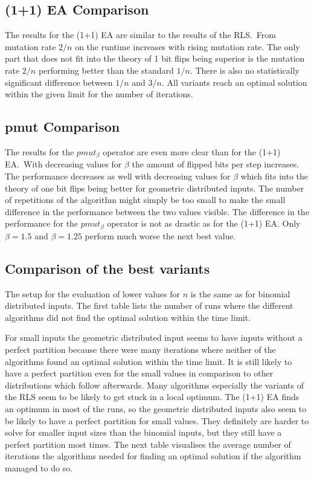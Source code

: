 \subsection{(1+1) EA Comparison}

The results for the (1+1) EA are similar to the results of the RLS.\ 
From mutation rate $2/n$ on the runtime increases with rising mutation rate.
The only part that does not fit into the theory of 1 bit flips being superior is the mutation rate $2/n$ performing better than the standard $1/n$.
There is also no statistically significant difference between $1/n$ and $3/n$.
All variants reach an optimal solution within the given limit for the number of iterations.
\subsection{pmut Comparison}

The results for the $pmut_\beta$ operator are even more clear than for the (1+1) EA.\
With decreasing values for $\beta$ the amount of flipped bits per step increases.
The performance decreases as well with decreasing values for $\beta$ which fits into the theory of one bit flips being better for geometric distributed inputs.
The number of repetitions of the algorithm might simply be too small to make the small difference in the performance between the two values visible.
The difference in the performance for the $pmut_\beta$ operator is not as drastic as for the (1+1) EA.
Only $\beta=1.5$ and $\beta=1.25$ perform much worse the next best value.

\subsection{Comparison of the best variants}
The setup for the evaluation of lower values for $n$ is the same as for binomial distributed inputs.
The first table lists the number of runs where the different algorithms did not find the optimal solution within the time limit.



For small inputs the geometric distributed input seems to have inputs without a perfect partition because there were many iterations where neither of the algorithms found an optimal solution within the time limit.
It is still likely to have a perfect partition even for the small values in comparison to other distributions which follow afterwards.
Many algorithms especially the variants of the RLS seem to be likely to get stuck in a local optimum.
The (1+1) EA finds an optimum in most of the runs, so the geometric distributed inputs also seem to be likely to have a perfect partition for small values.
They definitely are harder to solve for smaller input sizes than the binomial inputs, but they still have a perfect partition most times.
The next table visualises the average number of iterations the algorithms needed for finding an optimal solution if the algorithm managed to do so.

